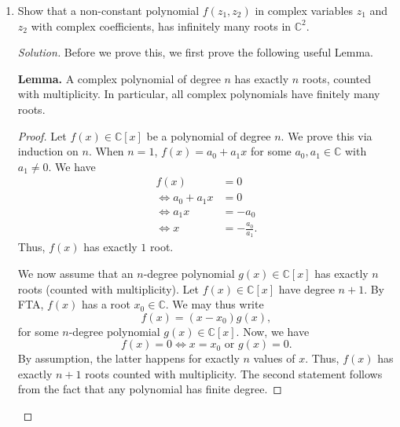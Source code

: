 \documentclass[11pt]{article}
\theoremstyle{definition}
\newenvironment{blockquote}
{\begin{mdframed}[skipabove=0pt, skipbelow=0pt, innertopmargin=4pt, innerbottommargin=4pt, bottomline=false,topline=false,rightline=false, linewidth=2pt]}
{\end{mdframed}}
\newenvironment{soln}{\begin{proof}[Solution]}{\end{proof}}
\begin{document}
\begin{enumerate}[leftmargin=*]
\begin{soln}
		Thus, $x_0$ and $\overline{x_0}$ are two distinct roots of $f(x)$. Define $g(x) \vcentcolon= (x-x_0)(x-\overline{x_0})$. A priori, we have $g(x) \in \mathbb{C}[x]$. However, note that
		\[
		    (x-x_0)(x-\overline{x_0}) = x^2 - (2\mathfrak{R}x_0)x + \abs{x_0}^2 \in \mathbb{R}[x].
		\]
		Thus, $g(x)$ is in fact a real polynomial. Since $x_0$ and $\overline{x_0}$ are distinct, we see that $g(x)$ divides $f(x)$ in $\mathbb{C}[x]$. (Why?) Thus,
		\[
		    f(x) = g(x) h(x)
		\]
		for some $h(x) \in \mathbb{C}[x]$. Again, since $f(x)$ and $g(x)$ are both real polynomials, so is $f(x)$. Moreover, since $\deg f(x) \geq 3$ and $\deg g(x) = 2$, we have $\deg h(x) \geq 1$, and we are done.

    \end{soln}
    
    \item Show that a non-constant polynomial $f(z_1, z_2)$ in complex variables $z_1$ and $z_2$ with complex coefficients, has infinitely many roots in $\mathbb{C}^2$.
    
    \begin{soln}
        Before we prove this, we first prove the following useful Lemma.
        
        \medskip
        
        \begin{blockquote}
			\textbf{Lemma.} A complex polynomial of degree $n$ has exactly $n$ roots, counted with multiplicity. In particular, all complex polynomials have finitely many roots. 
			\begin{proof} 
				Let $f(x) \in \mathbb{C}[x]$ be a polynomial of degree $n$. We prove this via induction on $n$. When $n = 1$, $f(x) = a_0 + a_1x$ for some $a_0,a_1 \in \mathbb{C}$ with $a_1 \neq 0$. We have
				\begin{align*}
				    f(x) &= 0 \\
				    \iff a_0 + a_1 x &= 0 \\
				    \iff a_1x &= -a_0 \\
				    \iff x &= -\frac{a_0}{a_1}.
				\end{align*}
				Thus, $f(x)$ has exactly $1$ root. 
				
				We now assume that an $n$-degree polynomial $g(x) \in \mathbb{C}[x]$ has exactly $n$ roots (counted with multiplicity). Let $f(x) \in \mathbb{C}[x]$ have degree $n+1$. By FTA, $f(x)$ has a root $x_0 \in \mathbb{C}$. We may thus write
				\[
				    f(x) = (x-x_0)g(x),
				\]
				for some $n$-degree polynomial $g(x) \in \mathbb{C}[x]$. Now, we have
				\[
				    f(x) = 0 \iff x = x_0 \text{ or } g(x) = 0.
				\]
				By assumption, the latter happens for exactly $n$ values of $x$. Thus, $f(x)$ has exactly $n+1$ roots counted with multiplicity. The second statement follows from the fact that any polynomial has finite degree.
			\end{proof}
		\end{blockquote}
        

\end{soln}
\end{enumerate}
\end{document}
